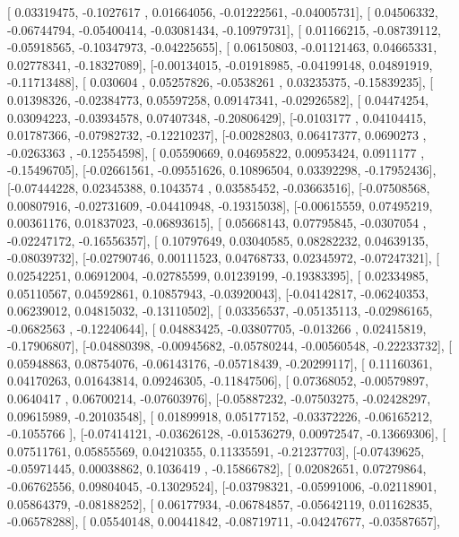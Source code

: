\documentclass{article}
\begin{document}
       [ 0.03319475, -0.1027617 ,  0.01664056, -0.01222561, -0.04005731],
       [ 0.04506332, -0.06744794, -0.05400414, -0.03081434, -0.10979731],
       [ 0.01166215, -0.08739112, -0.05918565, -0.10347973, -0.04225655],
       [ 0.06150803, -0.01121463,  0.04665331,  0.02778341, -0.18327089],
       [-0.00134015, -0.01918985, -0.04199148,  0.04891919, -0.11713488],
       [ 0.030604  ,  0.05257826, -0.0538261 ,  0.03235375, -0.15839235],
       [ 0.01398326, -0.02384773,  0.05597258,  0.09147341, -0.02926582],
       [ 0.04474254,  0.03094223, -0.03934578,  0.07407348, -0.20806429],
       [-0.0103177 ,  0.04104415,  0.01787366, -0.07982732, -0.12210237],
       [-0.00282803,  0.06417377,  0.0690273 , -0.0263363 , -0.12554598],
       [ 0.05590669,  0.04695822,  0.00953424,  0.0911177 , -0.15496705],
       [-0.02661561, -0.09551626,  0.10896504,  0.03392298, -0.17952436],
       [-0.07444228,  0.02345388,  0.1043574 ,  0.03585452, -0.03663516],
       [-0.07508568,  0.00807916, -0.02731609, -0.04410948, -0.19315038],
       [-0.00615559,  0.07495219,  0.00361176,  0.01837023, -0.06893615],
       [ 0.05668143,  0.07795845, -0.0307054 , -0.02247172, -0.16556357],
       [ 0.10797649,  0.03040585,  0.08282232,  0.04639135, -0.08039732],
       [-0.02790746,  0.00111523,  0.04768733,  0.02345972, -0.07247321],
       [ 0.02542251,  0.06912004, -0.02785599,  0.01239199, -0.19383395],
       [ 0.02334985,  0.05110567,  0.04592861,  0.10857943, -0.03920043],
       [-0.04142817, -0.06240353,  0.06239012,  0.04815032, -0.13110502],
       [ 0.03356537, -0.05135113, -0.02986165, -0.0682563 , -0.12240644],
       [ 0.04883425, -0.03807705, -0.013266  ,  0.02415819, -0.17906807],
       [-0.04880398, -0.00945682, -0.05780244, -0.00560548, -0.22233732],
       [ 0.05948863,  0.08754076, -0.06143176, -0.05718439, -0.20299117],
       [ 0.11160361,  0.04170263,  0.01643814,  0.09246305, -0.11847506],
       [ 0.07368052, -0.00579897,  0.0640417 ,  0.06700214, -0.07603976],
       [-0.05887232, -0.07503275, -0.02428297,  0.09615989, -0.20103548],
       [ 0.01899918,  0.05177152, -0.03372226, -0.06165212, -0.1055766 ],
       [-0.07414121, -0.03626128, -0.01536279,  0.00972547, -0.13669306],
       [ 0.07511761,  0.05855569,  0.04210355,  0.11335591, -0.21237703],
       [-0.07439625, -0.05971445,  0.00038862,  0.1036419 , -0.15866782],
       [ 0.02082651,  0.07279864, -0.06762556,  0.09804045, -0.13029524],
       [-0.03798321, -0.05991006, -0.02118901,  0.05864379, -0.08188252],
       [ 0.06177934, -0.06784857, -0.05642119,  0.01162835, -0.06578288],
       [ 0.05540148,  0.00441842, -0.08719711, -0.04247677, -0.03587657],
\end{document}
